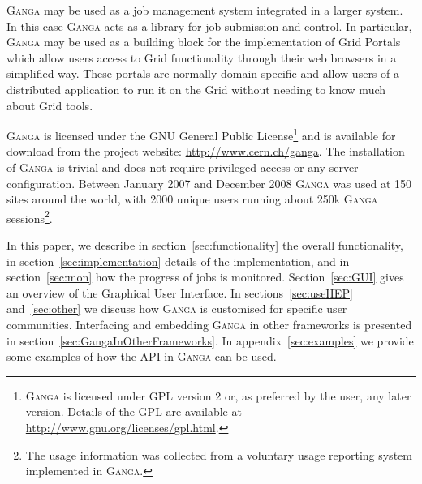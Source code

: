 \documentclass{elsart}
\def\ganga {\textsc{Ganga}\xspace}
\def\grid {Grid\xspace}
\begin{document}
\ganga may be used as a job management system integrated in a larger system. In this
case \ganga acts as a library for job submission and control. In particular,
\ganga may be used as a building block for the implementation of \grid Portals
which allow users access to \grid functionality through
their web browsers in a simplified way. These portals are normally
domain specific and allow users of a distributed application to run it
on the \grid without needing to know much about \grid tools. 

\ganga is licensed under the GNU General Public
License\footnote{\ganga is licensed under GPL version 2 or, as preferred by
the user, any later version.  Details of the GPL are available at
\url{http://www.gnu.org/licenses/gpl.html}.} and is available for download from
the project website: \url{http://www.cern.ch/ganga}. The installation of \ganga is trivial and
does not require privileged access or any server configuration. 
Between January 2007 and December 2008 \ganga was
used at 150 sites around the world, with 2000 unique users running about 250k %
\ganga sessions\footnote{The usage information was collected from a voluntary
  usage reporting system implemented in \ganga.}.

In this paper, we describe in section~\ref{sec:functionality} the
overall functionality, in section~\ref{sec:implementation} details of
the implementation, and in section~\ref{sec:mon} how the progress of
jobs is monitored. Section~\ref{sec:GUI} gives an overview of the
Graphical User Interface.  In sections~\ref{sec:useHEP}
and~\ref{sec:other} we discuss how \ganga is customised for specific
user communities. Interfacing and embedding \ganga in other frameworks
is presented in section~\ref{sec:GangaInOtherFrameworks}. In
appendix~\ref{sec:examples} we provide some examples of how the API in
\ganga can be used.
\end{document}
